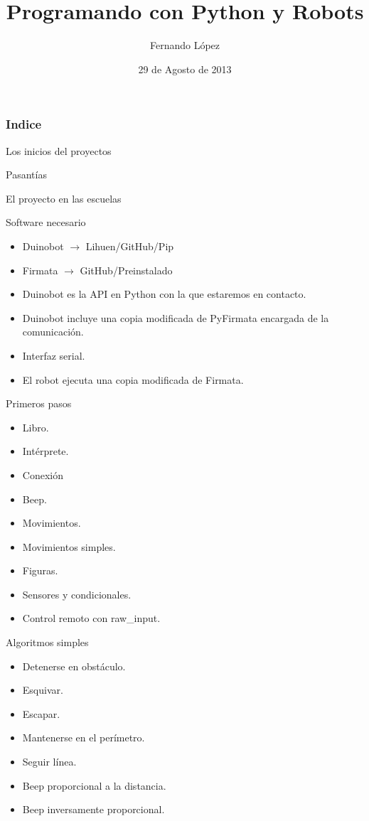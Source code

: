 \documentclass{beamer}[10]
\title{Programando con Python y Robots}
\author{Fernando López}
\institute{LINTI \\ Facultad de Informática \\ Universidad Nacional de la Plata
}
\date{29 de Agosto de 2013}
\begin{document}
\frame{\titlepage \vspace{-0.5cm}

}


\frame
{
\frametitle{Indice}
\tableofcontents[pausesection]
}

\begin{frame}{Los inicios del proyectos}
\end{frame}
\begin{frame}{Pasantías}
\end{frame}
\begin{frame}{El proyecto en las escuelas}
\end{frame}
\begin{frame}{Software necesario}
	\begin{itemize}
		\item Duinobot $\rightarrow$ Lihuen/GitHub/Pip
		\item Firmata $\rightarrow$ GitHub/Preinstalado
	\end{itemize}
	\begin{itemize}
		\item Duinobot es la API en Python con la que estaremos en contacto.
		\item Duinobot incluye una copia modificada de PyFirmata encargada de la comunicación.
		\item Interfaz serial.
		\item El robot ejecuta una copia modificada de Firmata.
	\end{itemize}
\end{frame}
\begin{frame}{Primeros pasos}
	\begin{itemize}
		\item Libro.
		\item Intérprete.
		\item Conexión
		\item Beep.
		\item Movimientos.
		\item Movimientos simples.
		\item Figuras.
		\item Sensores y condicionales.
		\item Control remoto con raw\_input.
	\end{itemize}
\end{frame}
\begin{frame}{Algoritmos simples}
	\begin{itemize}
		\item Detenerse en obstáculo.
		\item Esquivar.
		\item Escapar.
		\item Mantenerse en el perímetro.
		\item Seguir línea.
		\item Beep proporcional a la distancia.
		\item Beep inversamente proporcional.
	\end{itemize}
\end{frame}
\end{document}
